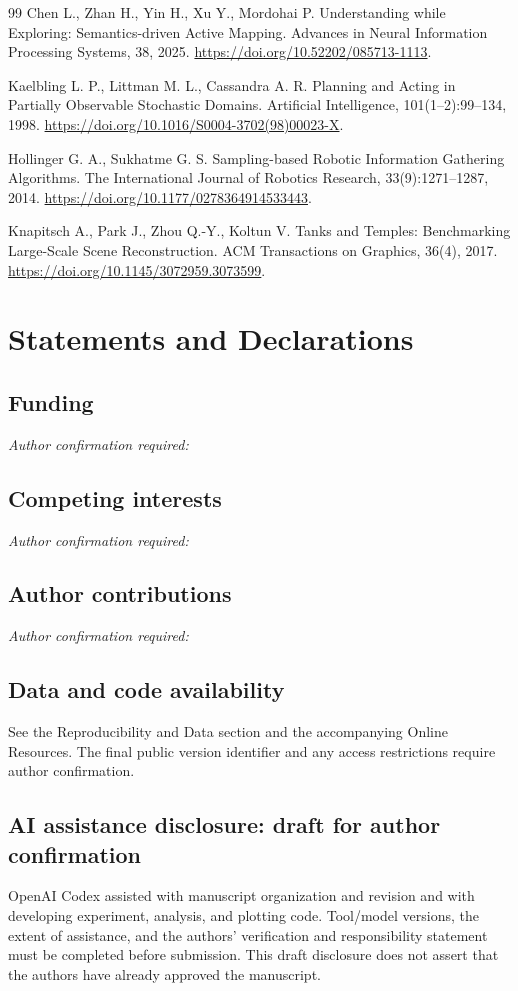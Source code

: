 \documentclass[pdflatex,sn-mathphys-num]{sn-jnl}
\begin{document}
\begin{thebibliography}{99}
 Chen L., Zhan H., Yin H., Xu Y., Mordohai P. Understanding while Exploring: Semantics-driven Active Mapping. Advances in Neural Information Processing Systems, 38, 2025. \url{https://doi.org/10.52202/085713-1113}.

 Kaelbling L. P., Littman M. L., Cassandra A. R. Planning and Acting in Partially Observable Stochastic Domains. Artificial Intelligence, 101(1--2):99--134, 1998. \url{https://doi.org/10.1016/S0004-3702(98)00023-X}.

 Hollinger G. A., Sukhatme G. S. Sampling-based Robotic Information Gathering Algorithms. The International Journal of Robotics Research, 33(9):1271--1287, 2014. \url{https://doi.org/10.1177/0278364914533443}.

 Knapitsch A., Park J., Zhou Q.-Y., Koltun V. Tanks and Temples: Benchmarking Large-Scale Scene Reconstruction. ACM Transactions on Graphics, 36(4), 2017. \url{https://doi.org/10.1145/3072959.3073599}.
\end{thebibliography}

\section*{Statements and Declarations}
\subsection*{Funding}
\textit{Author confirmation required:} \underline{\hspace{5cm}}
\subsection*{Competing interests}
\textit{Author confirmation required:} \underline{\hspace{5cm}}
\subsection*{Author contributions}
\textit{Author confirmation required:} \underline{\hspace{5cm}}
\subsection*{Data and code availability}
See the Reproducibility and Data section and the accompanying Online Resources.
The final public version identifier and any access restrictions require author confirmation.
\subsection*{AI assistance disclosure: draft for author confirmation}
OpenAI Codex assisted with manuscript organization and revision and with developing
experiment, analysis, and plotting code. Tool/model versions, the extent of assistance,
and the authors' verification and responsibility statement must be completed before submission.
This draft disclosure does not assert that the authors have already approved the manuscript.
\end{document}
